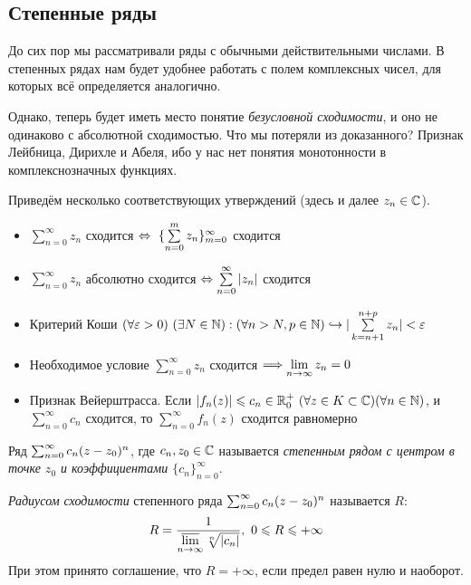 \subsection{Степенные ряды}

\begin{note}
	До сих пор мы рассматривали ряды с обычными действительными числами. В степенных рядах нам будет удобнее работать с полем комплексных чисел, для которых всё определяется аналогично.
	
	Однако, теперь будет иметь место понятие \textit{безусловной сходимости}, и оно не одинаково с абсолютной сходимостью. Что мы потеряли из доказанного? Признак Лейбница, Дирихле и Абеля, ибо у нас нет понятия монотонности в комплекснозначных функциях.
	
	Приведём несколько соответствующих утверждений (здесь и далее $z_n \in\Cm$).
	\begin{itemize}
		\item $\sum\limits_{n=0}^\infty z_n$ сходится $\lra\ \{\sum\limits_{n=0}^m z_n\}_{m=0}^\infty$ сходится\\
		\item 	$\sum\limits_{n=0}^\infty z_n$ абсолютно сходится $\lra\sum\limits_{n=0}^\infty |z_n|$ сходится \\
		\item Критерий Коши $(\forall\eps > 0)\ (\exists N\in\N) : (\forall n > N, p\in\N)\emb|\sum\limits_{k=n+1}^{n+p}z_n| <\eps $
		\item Необходимое условие $\sum\limits_{n=0}^\infty z_n$ сходится $\Longrightarrow\liml_{n\to\infty}z_n=0$
		\item Признак Вейерштрасса. Если $|f_n(z)|\le c_n\in\R^+_0\ (\forall z\in K\subset\Cm)(\forall n\in\N)$, и $\sum\limits_{n=0}^\infty c_n$ сходится, то $\sum\limits_{n=0}^\infty f_n(z)$ сходится равномерно
	\end{itemize}
	
	 
\end{note}

\begin{definition}
	Ряд $\row{n = 0}{c_n(z - z_0)^n}$, где $c_n, z_0 \in \Cm$ называется \textit{степенным рядом с центром в точке $z_0$ и коэффициентами $\{c_n\}_{n = 0}^\infty$}.
\end{definition}

\begin{definition}
	\textit{Радиусом сходимости} степенного ряда $\row{n = 0}{c_n(z - z_0)^n}$ называется $R$:
	\[
		R = \frac{1}{\varlimsup\limits_{n \to \infty} \sqrt[n]{|c_n|}},\ 0 \le R \le +\infty
	\]
	При этом принято соглашение, что $R = +\infty$, если предел равен нулю и наоборот.
\end{definition}

